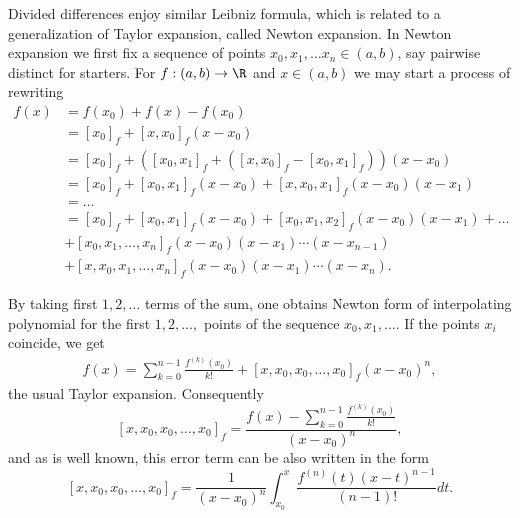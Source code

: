 Divided differences enjoy similar Leibniz formula, which is related to a generalization of Taylor expansion, called Newton expansion. In Newton expansion we first fix a sequence of points $x_{0}, x_{1}, \ldots x_{n} \in (a, b)$, say pairwise distinct for starters. For $f : (a, b) \to \R$ and $x \in (a, b)$ we may start a process of rewriting
\begin{align*}
	f(x) &= f(x_0) + f(x) - f(x_{0}) \\
	&= [x_{0}]_{f} + [x, x_{0}]_{f} (x - x_{0}) \\
	&= [x_{0}]_{f} + ([x_{0}, x_{1}]_{f} + ([x, x_{0}]_{f}- [x_{0}, x_{1}]_{f}))(x - x_{0}) \\
	&= [x_{0}]_{f} + [x_{0}, x_{1}]_{f} (x - x_{0})  + [x, x_{0}, x_{1}]_{f} (x - x_{0}) (x - x_{1}) \\
	&= \ldots \\
	&= [x_{0}]_{f} + [x_{0}, x_{1}]_{f} (x - x_{0})  + [x_{0}, x_{1}, x_{2}]_{f} (x - x_{0}) (x - x_{1}) + \ldots \\
	& + [x_{0}, x_{1}, \ldots, x_{n}]_{f} (x - x_{0}) (x - x_{1}) \cdots (x - x_{n - 1}) \\
	& + [x, x_{0}, x_{1}, \ldots, x_{n}]_{f} (x - x_{0}) (x - x_{1}) \cdots (x - x_{n}).
\end{align*}

By taking first $1, 2, \ldots$ terms of the sum, one obtains Newton form of interpolating polynomial for the first $1, 2, \ldots, $ points of the sequence $x_{0}, x_{1}, \ldots$. If the points $x_{i}$ coincide, we get
\begin{align}\label{taylor_expansion}
	f(x) = \sum_{k = 0}^{n - 1} \frac{f^{(k)}(x_{0})}{k!} + [x, x_{0}, x_{0}, \ldots, x_{0}]_{f} (x - x_{0})^{n},
\end{align}
the usual Taylor expansion. Consequently
\[
	[x, x_{0}, x_{0}, \ldots, x_{0}]_{f} = \frac{f(x) - \sum_{k = 0}^{n - 1} \frac{f^{(k)}(x_{0})}{k!}}{(x - x_{0})^{n}},
\]
and as is well known, this error term can be also written in the form
\[
	[x, x_{0}, x_{0}, \ldots, x_{0}]_{f} = \frac{1}{(x - x_{0})^{n}}\int_{x_{0}}^{x} \frac{f^{(n)}(t) (x - t)^{n - 1}}{(n - 1)!} dt.
\]

